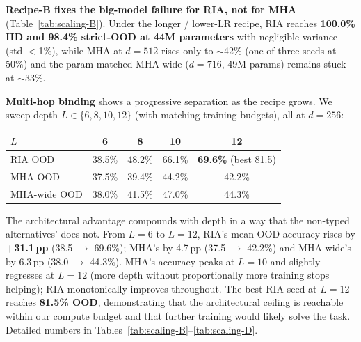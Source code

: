\documentclass{article}
\begin{document}
\textbf{Recipe-B fixes the big-model failure for RIA, not for MHA}
(Table~\ref{tab:scaling-B}). Under the longer / lower-LR recipe,
RIA reaches \textbf{100.0\% IID and 98.4\% strict-OOD at 44M
parameters} with negligible variance (std $<$1\%), while MHA at
$d{=}512$ rises only to $\sim$42\% (one of three seeds at 50\%) and
the param-matched MHA-wide ($d{=}716$, 49M params) remains stuck at
$\sim$33\%.

\textbf{Multi-hop binding} shows a progressive separation as the
recipe grows. We sweep depth $L \in \{6, 8, 10, 12\}$ (with matching
training budgets), all at $d{=}256$:

\begin{center}
\small
\begin{tabular}{lcccc}
\toprule
$L$           & 6   & 8   & 10  & 12 \\
\midrule
RIA OOD       & 38.5\% & 48.2\% & 66.1\% & \textbf{69.6\%} (best 81.5) \\
MHA OOD       & 37.5\% & 39.4\% & 44.2\% & 42.2\% \\
MHA-wide OOD  & 38.0\% & 41.5\% & 47.0\% & 44.3\% \\
\bottomrule
\end{tabular}
\end{center}

The architectural advantage compounds with depth in a way that the
non-typed alternatives' does not. From $L{=}6$ to $L{=}12$, RIA's
mean OOD accuracy rises by \textbf{+31.1\,pp} (38.5 $\to$ 69.6\%);
MHA's by 4.7\,pp (37.5 $\to$ 42.2\%) and MHA-wide's by 6.3\,pp
(38.0 $\to$ 44.3\%). MHA's accuracy peaks at $L{=}10$ and slightly
regresses at $L{=}12$ (more depth without proportionally more
training stops helping); RIA monotonically improves throughout.
The best RIA seed at $L{=}12$ reaches \textbf{81.5\% OOD},
demonstrating that the architectural ceiling is reachable within
our compute budget and that further training would likely
solve the task. Detailed numbers in
Tables~\ref{tab:scaling-B}--\ref{tab:scaling-D}.
\end{document}
